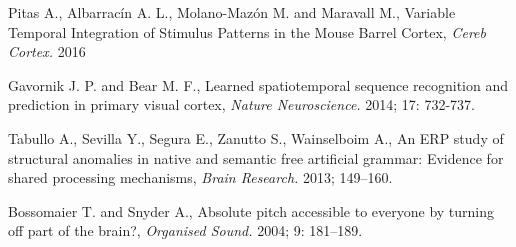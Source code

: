 \documentclass[11pt,a4paper]{article}
\begin{document}
\begin{thebibliography}{9}
  Pitas A., Albarracín A. L., Molano-Mazón M. and Maravall M.,
  Variable Temporal Integration of Stimulus Patterns in the Mouse Barrel Cortex,
  \emph{Cereb Cortex.} 2016

  Gavornik J. P. and Bear M. F.,
  Learned spatiotemporal sequence recognition and prediction in primary visual cortex,
  \emph{Nature Neuroscience.} 2014; 17: 732-737.

  Tabullo A., Sevilla Y., Segura E., Zanutto S., Wainselboim A.,
  An ERP study of structural anomalies in native and semantic free artificial grammar: Evidence for shared processing mechanisms,
  \emph{Brain Research.} 2013; 149–160.

  Bossomaier T. and Snyder A.,
  Absolute pitch accessible to everyone by turning off part of the brain?,
  \emph{Organised Sound.} 2004; 9: 181–189.




\end{thebibliography}
\end{document}
